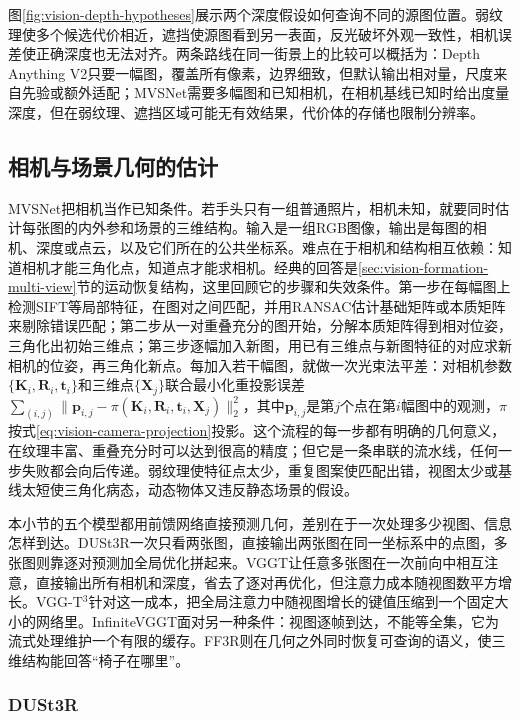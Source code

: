 图\ref{fig:vision-depth-hypotheses}展示两个深度假设如何查询不同的源图位置。弱纹理使多个候选代价相近，遮挡使源图看到另一表面，反光破坏外观一致性，相机误差使正确深度也无法对齐。两条路线在同一街景上的比较可以概括为：Depth Anything V2只要一幅图，覆盖所有像素，边界细致，但默认输出相对量，尺度来自先验或额外适配；MVSNet需要多幅图和已知相机，在相机基线已知时给出度量深度，但在弱纹理、遮挡区域可能无有效结果，代价体的存储也限制分辨率。

\subsection{相机与场景几何的估计}
\label{sec:vision-recognition-geometry}

MVSNet把相机当作已知条件。若手头只有一组普通照片，相机未知，就要同时估计每张图的内外参和场景的三维结构。输入是一组RGB图像，输出是每图的相机、深度或点云，以及它们所在的公共坐标系。难点在于相机和结构相互依赖：知道相机才能三角化点，知道点才能求相机。经典的回答是\ref{sec:vision-formation-multi-view}节的运动恢复结构，这里回顾它的步骤和失效条件。第一步在每幅图上检测SIFT等局部特征，在图对之间匹配，并用RANSAC估计基础矩阵或本质矩阵来剔除错误匹配；第二步从一对重叠充分的图开始，分解本质矩阵得到相对位姿，三角化出初始三维点；第三步逐幅加入新图，用已有三维点与新图特征的对应求新相机的位姿，再三角化新点。每加入若干幅图，就做一次光束法平差：对相机参数$\{\bm K_i,\bm R_i,\bm t_i\}$和三维点$\{\bm X_j\}$联合最小化重投影误差$\sum_{(i,j)}\lVert\bm p_{i,j}-\pi(\bm K_i,\bm R_i,\bm t_i,\bm X_j)\rVert_2^2$，其中$\bm p_{i,j}$是第$j$个点在第$i$幅图中的观测，$\pi$按式\eqref{eq:vision-camera-projection}投影。这个流程的每一步都有明确的几何意义，在纹理丰富、重叠充分时可以达到很高的精度；但它是一条串联的流水线，任何一步失败都会向后传递。弱纹理使特征点太少，重复图案使匹配出错，视图太少或基线太短使三角化病态，动态物体又违反静态场景的假设。

本小节的五个模型都用前馈网络直接预测几何，差别在于一次处理多少视图、信息怎样到达。DUSt3R一次只看两张图，直接输出两张图在同一坐标系中的点图，多张图则靠逐对预测加全局优化拼起来。VGGT让任意多张图在一次前向中相互注意，直接输出所有相机和深度，省去了逐对再优化，但注意力成本随视图数平方增长。VGG-T$^3$针对这一成本，把全局注意力中随视图增长的键值压缩到一个固定大小的网络里。InfiniteVGGT面对另一种条件：视图逐帧到达，不能等全集，它为流式处理维护一个有限的缓存。FF3R则在几何之外同时恢复可查询的语义，使三维结构能回答“椅子在哪里”。

\subsubsection{DUSt3R}
\label{sec:vision-recognition-dust3r}

